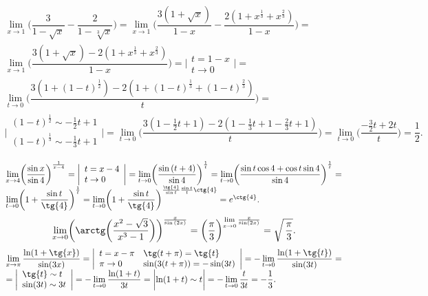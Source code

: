 $$
\begin{array}{l}
\lim\limits_{x\rightarrow1}\biggl(\dfrac{3}{1-\sqrt{x}} - \dfrac{2}{1-\sqrt[3]{x}}\biggr) =
\lim\limits_{x\rightarrow1}\biggl(\dfrac{3(1+\sqrt{x})}{1-x} - \dfrac{2(1+x^{\frac13}+x^{\frac23})}{1-x}\biggr) = \\
\lim\limits_{x\rightarrow1}\biggl(\dfrac{3(1+\sqrt{x})-2(1+x^{\frac13}+x^{\frac23})}{1-x}\biggr) =
\biggl|
\begin{array}{l}
t = 1 - x \\ t\rightarrow0
\end{array}
\biggr| = \\
\lim\limits_{t\rightarrow0}\biggl(\dfrac{3(1+(1-t)^{\frac12})-2(1+(1-t)^{\frac13}+(1-t)^{\frac23})}{t}\biggr) = \\
\biggl|
\begin{array}{l}
(1-t)^{\frac12} \sim -\frac12t+1 \\
(1-t)^{\frac13} \sim -\frac13t+1 \\
\end{array}
\biggr| = 
\lim\limits_{t\rightarrow0}\biggl(\dfrac{3(1-\frac12t+1)-2(1-\frac13t+1-\frac23t+1)}{t}\biggr) = 
\lim\limits_{t\rightarrow0}\biggl(\dfrac{-\frac32t+2t}{t}\biggr) = \dfrac12.
\end{array}
$$
$$
\begin{array}{l}
\lim\limits_{x\rightarrow4}\biggl(\dfrac{\sin{x}}{\sin{4}}\biggr)^{\frac{1}{x-4}} = 
\biggl|
\begin{array}{l}
t = x - 4 \\ t\rightarrow0
\end{array}
\biggr| =
\lim\limits_{t\rightarrow0}\biggl(\dfrac{\sin{(t+4)}}{\sin{4}}\biggr)^{\frac{1}{t}} = 
\lim\limits_{t\rightarrow0}\biggl(\dfrac{\sin{t}\cos{4}+\cos{t}\sin{4}}{\sin{4}}\biggr)^{\frac{1}{t}} = \\
\lim\limits_{t\rightarrow0}\biggl(1 + \dfrac{\sin{t}}{\tg{4}}\biggr)^{\frac{1}{t}} = 
\lim\limits_{t\rightarrow0}\biggl(1 + \dfrac{\sin{t}}{\tg{4}}\biggr)^{\frac{\tg{4}}{\sin{t}}\frac{\sin{t}}{t}\ctg{4}} = 
e^{\ctg{4}}.
\end{array}
$$
$$
\lim\limits_{x\rightarrow0}\biggl(\arctg\biggl(\dfrac{x^2-\sqrt{3}}{x^3-1}\biggr)\biggr)^{\frac{x}{\sin{(2x)}}} = 
\biggl(\dfrac{\pi}{3}\biggr)^{\lim\limits_{x\rightarrow0}\frac{x}{\sin(2x)}} = 
\sqrt{\,\dfrac{\pi}{3}}.
$$
$$
\begin{array}{l}
\lim\limits_{x\rightarrow\pi}\dfrac{\ln(1+\tg{x})}{\sin(3x)} = 
\biggl|
\begin{array}{ll}
t = x - \pi & \tg(t+\pi) = \tg{t}	\\ 
\pi\rightarrow0 & \sin(3(t+\pi)) = -\sin(3t)
\end{array}
\biggr| =
-\lim\limits_{t\rightarrow0}\dfrac{\ln(1+\tg{t})}{\sin(3t)} = \\
= \biggl|
\begin{array}{l}
\tg{t} \sim t	\\ 
\sin(3t) \sim 3t
\end{array}
\biggr| =
- \lim\limits_{t\rightarrow0}\dfrac{\ln(1+t)}{3t} = 
\biggl|
\ln(1+t) \sim t
\biggr| = 
- \lim\limits_{t\rightarrow0}\dfrac{t}{3t} = - \dfrac{1}{3}.
\end{array}
$$


